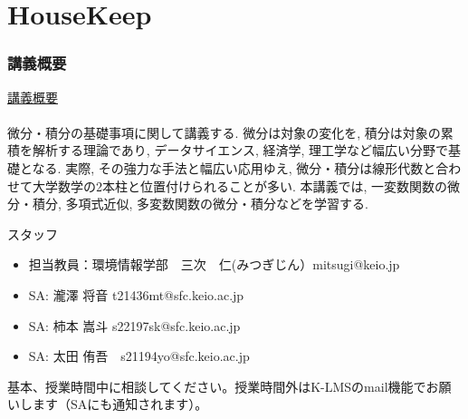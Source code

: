 \section{HouseKeep}
\begin{frame}
\frametitle{講義概要}   

\underline{講義概要} \\
\ \\

微分・積分の基礎事項に関して講義する. 
微分は対象の変化を, 積分は対象の累積を解析する理論であり, データサイエンス, 経済学, 理工学など幅広い分野で基礎となる. 
実際, その強力な手法と幅広い応用ゆえ, 微分・積分は線形代数と合わせて大学数学の2本柱と位置付けられることが多い. 
本講義では, 一変数関数の微分・積分, 多項式近似, 多変数関数の微分・積分などを学習する. 





\end{frame}

\begin{slide}{スタッフ}
\begin{itemize}
\item 担当教員：環境情報学部　三次　仁(みつぎじん）mitsugi@keio.jp
\item SA:  瀧澤 将音 t21436mt@sfc.keio.ac.jp
\item SA: 柿本 嵩斗  s22197sk@sfc.keio.ac.jp
\item SA: 太田 侑吾　s21194yo@sfc.keio.ac.jp
\end{itemize}
基本、授業時間中に相談してください。授業時間外はK-LMSのmail機能でお願いします（SAにも通知されます）。
\end{slide}

